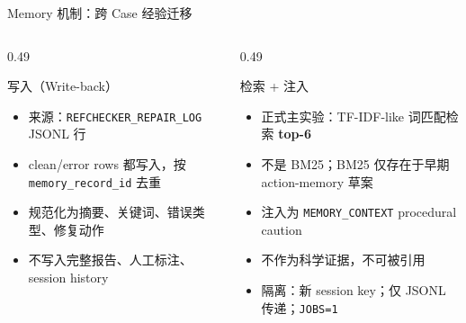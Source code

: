 \documentclass[UTF8,fontset=fandol,aspectratio=169]{ctexbeamer}
\begin{document}
\begin{frame}{Memory 机制：跨 Case 经验迁移}
  \vspace{-0.2em}
  \begin{columns}[T,onlytextwidth]
    \begin{column}{0.49\textwidth}
      \begin{block}{写入（Write-back）}
        \scriptsize
        \begin{itemize}
          \setlength{\itemsep}{1pt}
          \item 来源：\texttt{REFCHECKER\_REPAIR\_LOG} JSONL 行
          \item clean/error rows 都写入，按 \texttt{memory\_record\_id} 去重
          \item 规范化为摘要、关键词、错误类型、修复动作
          \item \alert{不写入}完整报告、人工标注、session history
        \end{itemize}
      \end{block}
    \end{column}
    \begin{column}{0.49\textwidth}
      \begin{block}{检索 + 注入}
        \scriptsize
        \begin{itemize}
          \setlength{\itemsep}{1pt}
          \item 正式主实验：TF-IDF-like 词匹配检索 \textbf{top-6}
          \item 不是 BM25；BM25 仅存在于早期 action-memory 草案
          \item 注入为 \texttt{MEMORY\_CONTEXT} procedural caution
          \item \alert{不作为科学证据，不可被引用}
          \item 隔离：新 session key；仅 JSONL 传递；\texttt{JOBS=1}
        \end{itemize}
      \end{block}
    \end{column}
  \end{columns}
\end{frame}
\end{document}
